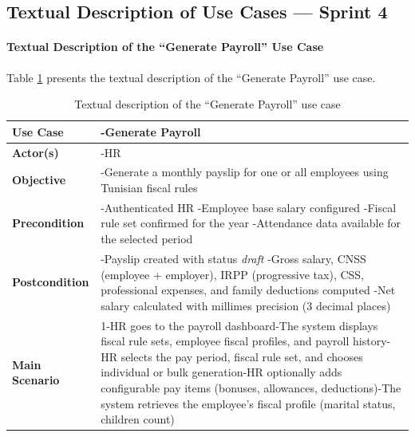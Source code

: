 \subsection{Textual Description of Use Cases — Sprint 4}

\paragraph{Textual Description of the ``Generate Payroll'' Use Case}
Table \ref{tab:generate-payroll} presents the textual description of the ``Generate Payroll'' use case.

\begin{longtable}{|p{}|p{}|}
\caption{Textual description of the ``Generate Payroll'' use case}
\label{tab:generate-payroll}\\
    \hline
   \textbf{Use Case} & -Generate Payroll \\
    \hline
    \textbf{Actor(s)} & -HR \\
    \hline
    \textbf{Objective} & -Generate a monthly payslip for one or all employees using Tunisian fiscal rules \\
    \hline
    \textbf{Precondition} & -Authenticated HR\newline
-Employee base salary configured\newline
-Fiscal rule set confirmed for the year\newline
-Attendance data available for the selected period \\
    \hline
    \textbf{Postcondition} & -Payslip created with status \textit{draft}\newline
-Gross salary, CNSS (employee + employer), IRPP (progressive tax), CSS, professional expenses, and family deductions computed\newline
-Net salary calculated with millimes precision (3 decimal places) \\
    \hline
    \textbf{Main Scenario}
    & 1-HR goes to the payroll dashboard\newline
2-The system displays fiscal rule sets, employee fiscal profiles, and payroll history\newline
3-HR selects the pay period, fiscal rule set, and chooses individual or bulk generation\newline
4-HR optionally adds configurable pay items (bonuses, allowances, deductions)\newline
5-The system retrieves the employee's fiscal profile (marital status, children count)\newline

\end{longtable}
